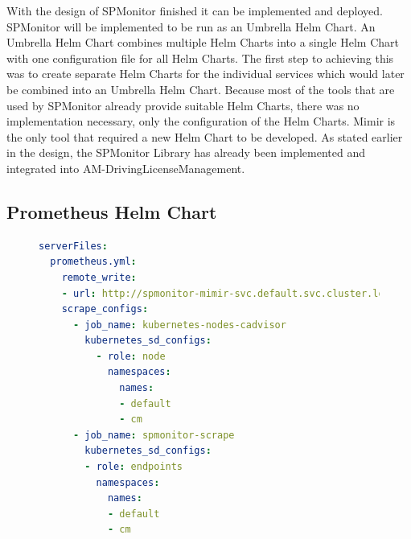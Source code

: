 
With the design of SPMonitor finished it can be implemented and deployed.
SPMonitor will be implemented to be run as an Umbrella Helm Chart.
An Umbrella Helm Chart combines multiple Helm Charts into a single Helm Chart with one configuration file
for all Helm Charts.
The first step to achieving this was to create separate Helm Charts for the individual services
which would later be combined into an Umbrella Helm Chart.
Because most of the tools that are used by SPMonitor already provide suitable Helm Charts,
there was no implementation necessary, only the configuration of the Helm Charts. Mimir is the only tool
that required a new Helm Chart to be developed.
As stated earlier in the design, the SPMonitor Library has already been implemented and integrated into AM-DrivingLicenseManagement.

\subsection*{Prometheus Helm Chart}

\begin{figure}[tb]
\begin{lstlisting}[caption = {Prometheus Helm Chart Configuration}, label = {lis:prometheus_config}, style = kit-cm, language=yaml]
serverFiles:
  prometheus.yml:
    remote_write:
    - url: http://spmonitor-mimir-svc.default.svc.cluster.local:9009/api/v1/push
    scrape_configs:
      - job_name: kubernetes-nodes-cadvisor
        kubernetes_sd_configs:
          - role: node
            namespaces:
              names:
              - default
              - cm
      - job_name: spmonitor-scrape
        kubernetes_sd_configs:
        - role: endpoints
          namespaces:
            names:
            - default
            - cm
\end{lstlisting}
\end{figure}

